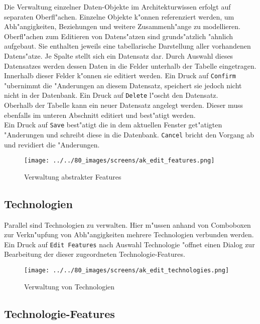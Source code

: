 \documentclass{proc}
\begin{document}
	Die Verwaltung einzelner Daten-Objekte im Architekturwissen erfolgt auf separaten Oberfl"achen.
	Einzelne Objekte k"onnen referenziert werden, um Abh"angigkeiten, Beziehungen und weitere Zusammenh"ange zu modellieren.
	\\
	Oberfl"achen zum Editieren von Datens"atzen sind grunds"atzlich "ahnlich aufgebaut.
	Sie enthalten jeweils eine tabellarische Darstellung aller vorhandenen Datens"atze.
	Je Spalte stellt sich ein Datensatz dar.
	Durch Auswahl dieses Datensatzes werden dessen Daten in die Felder unterhalb der Tabelle eingetragen.
	Innerhalb dieser Felder k"onnen sie editiert werden.
	Ein Druck auf \texttt{Confirm} "ubernimmt die "Anderungen an diesem Datensatz, speichert sie jedoch nicht nicht in der Datenbank.
	Ein Druck auf \texttt{Delete} l"oscht den Datensatz.\\
	Oberhalb der Tabelle kann ein neuer Datensatz angelegt werden.
	Dieser muss ebenfalls im unteren Abschnitt editiert und best"atigt werden.
	\\
	Ein Druck auf \texttt{Save} best"atigt die in dem aktuellen Fenster get"atigten "Anderungen und schreibt diese in die Datenbank.
	\texttt{Cancel} bricht den Vorgang ab und revidiert die "Anderungen.
	
	\begin{figure}[h!]
		\centering
		\caption{Verwaltung abstrakter Features}
		\texttt{[image: ../../80\_images/screens/ak\_edit\_features.png]}
	\end{figure}
	
	\subsection{Technologien}
	
	Parallel sind Technologien zu verwalten.
	Hier m"ussen anhand von Comboboxen zur Verkn"upfung von Abh"angigkeiten mehrere Technologien verbunden werden.
	\\
	Ein Druck auf \texttt{Edit Features} nach Auswahl Technologie "offnet einen Dialog zur Bearbeitung der dieser zugeordneten Technologie-Features.
	
	\begin{figure}[h!]
		\centering
		\caption{Verwaltung von Technologien}
		\texttt{[image: ../../80\_images/screens/ak\_edit\_technologies.png]}
	\end{figure}
	
	\subsection{Technologie-Features}
	
\end{document}
